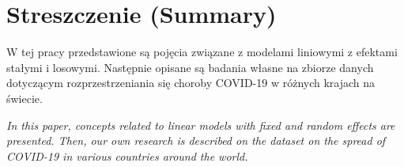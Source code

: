 \documentclass[12pt]{mwbk}
\theoremstyle{plain}
\theoremstyle{definition}
\theoremstyle{remark}
\begin{document}
\chapter*{Streszczenie (Summary)}

\bigskip
\bigskip

\begin{center}
  \textbf{\tytul}
\end{center}

W tej pracy przedstawione są pojęcia związane z modelami liniowymi z efektami stałymi i losowymi. Następnie opisane są badania własne na zbiorze danych dotyczącym rozprzestrzeniania się choroby COVID-19 w różnych krajach na świecie.


\bigskip

\begin{center}
  \textbf{\textit{\tytulangielski}}
\end{center}



{\it
In this paper, concepts related to linear models with fixed and random effects are presented. Then, our own research is described on the dataset on the spread of COVID-19 in various countries around the world.
}
\end{document}
